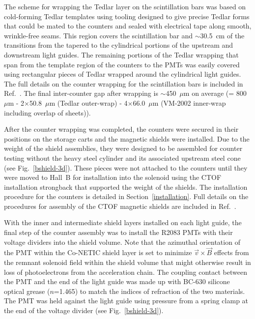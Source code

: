 \documentclass{elsart}
\begin{document}
The scheme for wrapping the Tedlar layer on the scintillation bars was based on cold-forming 
Tedlar templates using tooling designed to give precise Tedlar forms that could be mated to the 
counters and sealed with electrical tape along smooth, wrinkle-free seams.  This region covers the 
scintillation bar and $\sim$30.5~cm of the transitions from the tapered to the cylindrical portions
of the upstream and downstream light guides. The remaining portions of the Tedlar wrapping that 
span from the template region of the counters to the PMTs was easily covered using rectangular 
pieces of Tedlar wrapped around the cylindrical light guides. The full details on the counter 
wrapping for the scintillation bars is included in Ref.~\cite{ctof-wrapping}. The final inter-counter
gap after wrapping is $\sim$450~$\mu$m on average (= 800~$\mu$m - 2$\times$50.8~$\mu$m
(Tedlar outer-wrap) - 4$\times$66.0~$\mu$m (VM-2002 inner-wrap including overlap of sheets)).

After the counter wrapping was completed, the counters were secured in their positions on the
storage carts and the magnetic shields were installed. Due to the weight of the shield assemblies,
they were designed to be assembled for counter testing without the heavy steel cylinder and its
associated upstream steel cone (see Fig.~\ref{bshield-3d}). These pieces were not attached to the
counters until they were moved to Hall~B for installation into the solenoid using the CTOF installation
strongback that supported the weight of the shields. The installation procedure for the counters is
detailed in Section~\ref{installation}. Full details on the procedures for assembly of the CTOF
magnetic shields are included in Ref.~\cite{ctof-sh-assy}.

With the inner and intermediate shield layers installed on each light guide, the final step of the
counter assembly was to install the R2083 PMTs with their voltage dividers into the shield volume.
Note that the azimuthal orientation of the PMT within the Co-NETIC shield layer is set to
minimize $\vec{v} \times \vec{B}$ effects from the remnant solenoid field within the shield volume
that might otherwise result in loss of photoelectrons from the acceleration chain. The coupling contact
between the PMT and the end of the light guide was made up with BC-630 silicone optical grease
\cite{bc-630} ($n$=1.465) to match the indices of refraction of the two materials. The PMT was held
against the light guide using pressure from a spring clamp at the end of the voltage divider (see
Fig.~\ref{bshield-3d}).
\end{document}
